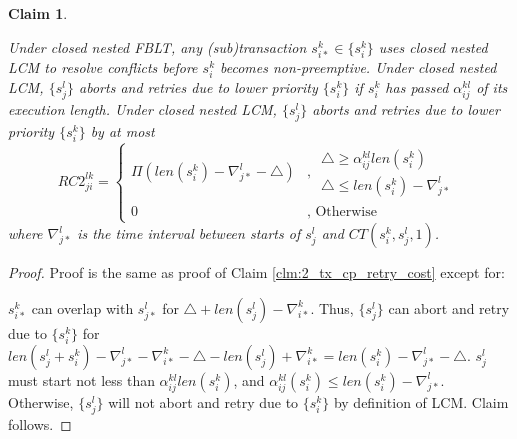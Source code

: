 \documentclass[preprint]{sigplanconf}
\newtheorem{clm}{Claim}
\begin{document}
\begin{clm}\label{clm:closed_nested_lcm_after_alpha}

Under closed nested FBLT, any (sub)transaction $s_{i*}^{k}\in\{s_{i}^{k}\}$
uses closed nested LCM to resolve conflicts before $s_{i}^{k}$ becomes
non-preemptive. Under closed nested LCM, $\{s_{j}^{l}\}$ aborts and
retries due to lower priority $\{s_{i}^{k}\}$ if $s_{i}^{k}$ has
passed $\alpha_{ij}^{kl}$ of its execution length. Under closed nested
LCM, $\{s_{j}^{l}\}$ aborts and retries due to lower priority $\{s_{i}^{k}\}$
by at most 
\begin{equation}
RC2_{ji}^{lk}=\begin{cases}
\Pi\left(len\left(s_{i}^{k}\right)-\nabla_{j*}^{l}-\triangle\right) & ,\,\begin{gathered}\triangle\ge\alpha_{ij}^{kl}len\left(s_{i}^{k}\right)\\
\triangle\le len\left(s_{i}^{k}\right)-\nabla_{j*}^{l}
\end{gathered}
\\
0 & ,\mbox{ Otherwise}
\end{cases}\label{eq:closed_nested_lcm_after_alpha_two_tx}
\end{equation}
 where $\nabla_{j*}^{l}$ is the time interval between starts of $s_{j}^{l}$
and $CT(s_{i}^{k},s_{j}^{l},1)$.

\end{clm}
%
\begin{proof}

Proof is the same as proof of Claim \ref{clm:2_tx_cp_retry_cost}
except for:

$s_{i*}^{k}$ can overlap with $s_{j*}^{l}$ for $\triangle+len\left(s_{j}^{l}\right)-\nabla_{i*}^{k}$.
Thus, $\{s_{j}^{l}\}$ can abort and retry due to $\{s_{i}^{k}\}$
for $len\left(s_{j}^{l}+s_{i}^{k}\right)-\nabla_{j*}^{l}-\nabla_{i*}^{k}-\triangle-len\left(s_{j}^{l}\right)+\nabla_{i*}^{k}=len\left(s_{i}^{k}\right)-\nabla_{j*}^{l}-\triangle$.
$s_{j}^{l}$ must start not less than $\alpha_{ij}^{kl}len\left(s_{i}^{k}\right)$,
and $\alpha_{ij}^{kl}\left(s_{i}^{k}\right)\le len\left(s_{i}^{k}\right)-\nabla_{j*}^{l}$.
Otherwise, $\{s_{j}^{l}\}$ will not abort and retry due to $\{s_{i}^{k}\}$
by definition of LCM. Claim follows.
%
\end{proof}
%
\end{document}
